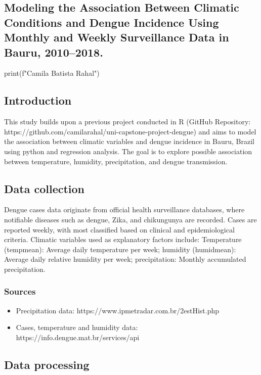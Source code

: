 \documentclass{article}
\begin{document}
\begin{center}
\section*{Modeling the Association Between Climatic Conditions and Dengue Incidence Using Monthly and Weekly Surveillance Data in Bauru, 2010–2018.}

\begin{pycode}
print(f"Camila Batista Rahal")
\end{pycode}
\end{center}

\subsection*{Introduction}
This study builds upon a previous project conducted in R (GitHub Repository: https://github.com/camilarahal/uni-capstone-project-dengue) and aims to model the association between climatic variables and dengue incidence in Bauru, Brazil using python and regression analysis. The goal is to explore possible association between temperature, humidity, precipitation, and dengue transmission.


\subsection*{Data collection}
Dengue cases data originate from official health surveillance databases, where notifiable diseases such as dengue, Zika, and chikungunya are recorded. Cases are reported weekly, with most classified based on clinical and epidemiological criteria. Climatic variables used as explanatory factors include: Temperature (tempmean): Average daily temperature per week; humidity (humidmean): Average daily relative humidity per week; precipitation: Monthly accumulated precipitation.

\subsubsection*{Sources}

\begin{itemize}
    \item Precipitation data: https://www.ipmetradar.com.br/2estHist.php
    \item Cases, temperature and humidity data: https://info.dengue.mat.br/services/api
\end{itemize}

\subsection*{Data processing}
\end{document}
